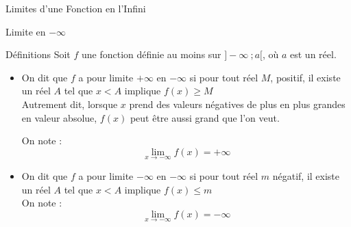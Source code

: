 \documentclass{cours}
\begin{document}
\begin{Gpartie}{Limites d'une Fonction en l'Infini}
        \begin{Spartie}{Limite en $-\infty$} 
            \begin{SSpartie}{Définitions}
                Soit $f$ une fonction définie au moins sur $\big]-\infty~;a\big[$, où $a$ est un réel.
                \begin{itemize}
                    \item   On dit que $f$ a pour limite $+\infty$ en $-\infty$ si pour tout réel $M$, positif, il existe un réel $A$ tel que $x<A$ implique $f(x)\geq M$ \\ Autrement dit, lorsque $x$ prend des valeurs négatives de plus en plus grandes en valeur absolue, $f(x)$ peut être aussi grand que l'on veut.
                    
                    On note : \[\boxed{\lim\limits_{x\to-\infty}f(x)=+\infty}\]
                    \begin{center}
                        \parbox{\linewidth}{}
                    \end{center}
                    \pagebreak
                    \item   On dit que $f$ a pour limite $-\infty$ en $-\infty$ si pour tout réel $m$ négatif, il existe un réel $A$ tel que $x<A$ implique $f(x)\leq m$ \\ On note : \[\boxed{\lim\limits_{x\to-\infty}f(x)=-\infty}\]
                    \begin{center}

\end{center}
\end{itemize}
\end{SSpartie}
\end{Spartie}
\end{Gpartie}
\end{document}
